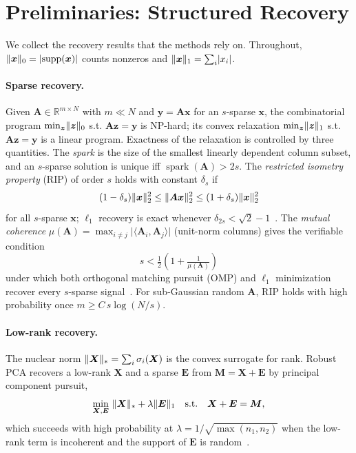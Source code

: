 \documentclass{article}
\DeclarePairedDelimiter{\norm}{\lVert}{\rVert}
\DeclareMathOperator{\spark}{spark}
\DeclareMathOperator{\supp}{supp}
\newcommand{\R}{\mathbb{R}}
\newcommand{\M}{\bm{M}}
\newcommand{\X}{\bm{X}}
\newcommand{\Ev}{\bm{E}}
\newcommand{\A}{\bm{A}}
\newcommand{\xv}{\bm{x}}
\newcommand{\yv}{\bm{y}}
\begin{document}
\section{Preliminaries: Structured Recovery}
\label{sec:theory}
We collect the recovery results that the methods rely on. Throughout,
$\norm{\xv}_0=\lvert\supp(\xv)\rvert$ counts nonzeros and
$\norm{\xv}_1=\sum_i\lvert x_i\rvert$.

\paragraph{Sparse recovery.}
Given $\A\in\R^{m\times N}$ with $m\ll N$ and $\yv=\A\xv$ for an $s$-sparse
$\xv$, the combinatorial program $\min_{\bm z}\norm{\bm z}_0$ s.t. $\A\bm z=\yv$ is
NP-hard; its convex relaxation $\min_{\bm z}\norm{\bm z}_1$ s.t. $\A\bm z=\yv$ is a
linear program. Exactness of the relaxation is controlled by three quantities. The
\emph{spark} is the size of the smallest linearly dependent column subset, and an
$s$-sparse solution is unique iff $\spark(\A)>2s$. The \emph{restricted isometry
property} (RIP) of order $s$ holds with constant $\delta_s$ if
\begin{equation}
(1-\delta_s)\norm{\xv}_2^2\le\norm{\A\xv}_2^2\le(1+\delta_s)\norm{\xv}_2^2
\end{equation}
for all $s$-sparse $\xv$; $\ell_1$ recovery is exact whenever
$\delta_{2s}<\sqrt{2}-1$~\cite{candes2006rip}. The \emph{mutual coherence}
$\mu(\A)=\max_{i\ne j}\lvert\langle\A_i,\A_j\rangle\rvert$ (unit-norm columns)
gives the verifiable condition
\begin{equation}
\label{eq:coh}
s<\tfrac12\!\left(1+\tfrac1{\mu(\A)}\right)
\end{equation}
under which both orthogonal matching pursuit (OMP) and $\ell_1$ minimization
recover every $s$-sparse signal~\cite{tropp2007omp,donoho2006cs}. For
sub-Gaussian random $\A$, RIP holds with high probability once
$m\ge C\,s\log(N/s)$.

\paragraph{Low-rank recovery.}
The nuclear norm $\norm{\X}_*=\sum_i\sigma_i(\X)$ is the convex surrogate for rank.
Robust PCA recovers a low-rank $\X$ and a sparse $\Ev$ from $\M=\X+\Ev$ by
principal component pursuit,
\begin{equation}
\label{eq:rpca}
\min_{\X,\Ev}\ \norm{\X}_*+\lambda\norm{\Ev}_1
\quad\text{s.t.}\quad \X+\Ev=\M,
\end{equation}
which succeeds with high probability at $\lambda=1/\sqrt{\max(n_1,n_2)}$ when the
low-rank term is incoherent and the support of $\Ev$ is
random~\cite{candes2011rpca,candes2009matrixcompletion}.
\end{document}
